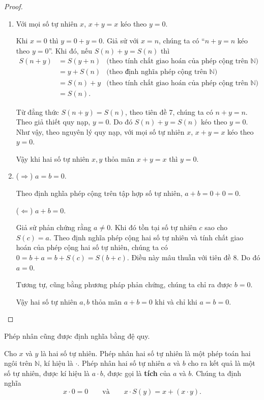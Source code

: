 \begin{proof}
	\begin{enumerate}[label={(\roman*)}]
		\item Với mọi số tự nhiên $x$, $x + y = x$ kéo theo $y = 0$.

		      Khi $x = 0$ thì $y = 0 + y = 0$. Giả sử với $x = n$, chúng ta có ``$n + y = n$ kéo theo $y = 0$''. Khi đó, nếu $S(n) + y = S(n)$ thì
		      \begin{align*}
			      S(n + y) & = S(y + n) & \text{(theo tính chất giao hoán của phép cộng trên $\mathbb{N}$)} \\
			               & = y + S(n) & \text{(theo định nghĩa phép cộng trên $\mathbb{N}$)}              \\
			               & = S(n) + y & \text{(theo tính chất giao hoán của phép cộng trên $\mathbb{N}$)} \\
			               & = S(n).
		      \end{align*}

		      Từ đẳng thức $S(n + y) = S(n)$, theo tiên đề 7, chúng ta có $n + y = n$. Theo giả thiết quy nạp, $y = 0$. Do đó $S(n) + y = S(n)$ kéo theo $y = 0$. Như vậy, theo nguyên lý quy nạp, với mọi số tự nhiên $x$, $x + y = x$ kéo theo $y = 0$.

		      Vậy khi hai số tự nhiên $x, y$ thỏa mãn $x + y = x$ thì $y = 0$.
		\item ($\Rightarrow$) $a = b = 0$.

		      Theo định nghĩa phép cộng trên tập hợp số tự nhiên, $a + b = 0 + 0 = 0$.

		      ($\Leftarrow$) $a + b = 0$.

		      Giả sử phản chứng rằng $a\ne 0$. Khi đó tồn tại số tự nhiên $c$ sao cho $S(c) = a$. Theo định nghĩa phép cộng hai số tự nhiên và tính chất giao hoán của phép cộng hai số tự nhiên, chúng ta có $0 = b + a = b + S(c) = S(b + c)$. Điều này mâu thuẫn với tiên đề 8. Do đó $a = 0$.

		      Tương tự, cũng bằng phương pháp phản chứng, chúng ta chỉ ra được $b = 0$.

		      Vậy hai số tự nhiên $a, b$ thỏa mãn $a + b = 0$ khi và chỉ khi $a = b = 0$.
	\end{enumerate}
\end{proof}

Phép nhân cũng được định nghĩa bằng đệ quy.
\begin{definition}
	Cho $x$ và $y$ là hai số tự nhiên. Phép nhân hai số tự nhiên là một phép toán hai ngôi trên $\mathbb{N}$, kí hiệu là $\cdot$. Phép nhân hai số tự nhiên $a$ và $b$ cho ra kết quả là một số tự nhiên, được kí hiệu là $a\cdot b$, được gọi là \textbf{tích} của $a$ và $b$. Chúng ta định nghĩa
	\[
		x\cdot 0 = 0\qquad\text{và}\qquad x\cdot S(y) = x + (x\cdot y).
	\]
\end{definition}

